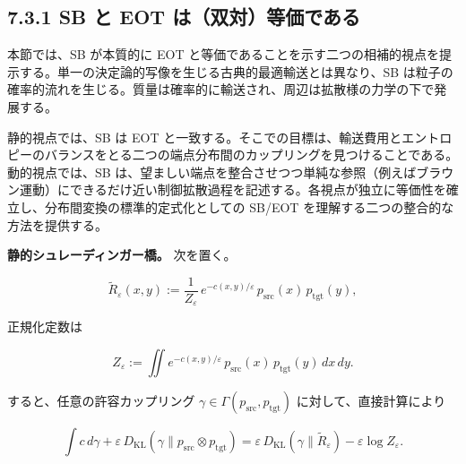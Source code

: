 

\subsection*{7.3.1 SB と EOT は（双対）等価である}


本節では、SB が本質的に EOT と等価であることを示す二つの相補的視点を提示する。単一の決定論的写像を生じる古典的最適輸送とは異なり、SB は粒子の確率的流れを生じる。質量は確率的に輸送され、周辺は拡散様の力学の下で発展する。

静的視点では、SB は EOT と一致する。そこでの目標は、輸送費用とエントロピーのバランスをとる二つの端点分布間のカップリングを見つけることである。動的視点では、SB は、望ましい端点を整合させつつ単純な参照（例えばブラウン運動）にできるだけ近い制御拡散過程を記述する。各視点が独立に等価性を確立し、分布間変換の標準的定式化としての SB/EOT を理解する二つの整合的な方法を提供する。

\textbf{静的シュレーディンガー橋。} 次を置く。

\[
\widetilde{R}_\varepsilon(x,y)
:=
\frac{1}{Z_\varepsilon}\,e^{-c(x,y)/\varepsilon}\,p_{\mathrm{src}}(x)\,p_{\mathrm{tgt}}(y),
\]


正規化定数は

\[
Z_\varepsilon:=\iint e^{-c(x,y)/\varepsilon}\,p_{\mathrm{src}}(x)\,p_{\mathrm{tgt}}(y)\,dx\,dy.
\]


すると、任意の許容カップリング $\gamma\in\Gamma(p_{\mathrm{src}},p_{\mathrm{tgt}})$ に対して、直接計算により

\[
\int c\,d\gamma+\varepsilon\,D_{\mathrm{KL}}(\gamma\|p_{\mathrm{src}}\otimes p_{\mathrm{tgt}})
=
\varepsilon\,D_{\mathrm{KL}}(\gamma\|\widetilde{R}_\varepsilon)-\varepsilon\log Z_\varepsilon.
\]


